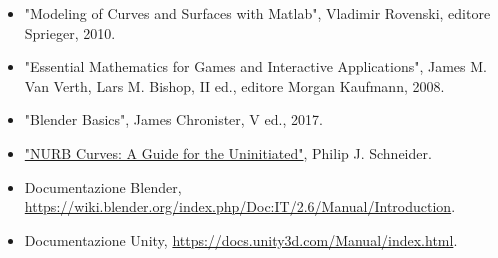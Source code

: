 \begin{itemize}
	\item "Modeling of Curves and Surfaces with Matlab", Vladimir Rovenski, editore Sprieger, 2010.
	\item "Essential Mathematics for Games and Interactive Applications", James M. Van Verth, Lars M. Bishop, II ed., editore Morgan Kaufmann, 2008.
	\item "Blender Basics", James Chronister, V ed., 2017.
	\item \href{http://www.mactech.com/articles/develop/issue_25/schneider.html}{"NURB Curves: A Guide for the Uninitiated"}, Philip J. Schneider.
	\item Documentazione Blender, \href{https://wiki.blender.org/index.php/Doc:IT/2.6/Manual/Introduction}{https://wiki.blender.org/index.php/Doc:IT/2.6/Manual/Introduction}.
	\item Documentazione Unity, \href{https://docs.unity3d.com/Manual/index.html}{https://docs.unity3d.com/Manual/index.html}.
\end{itemize}
